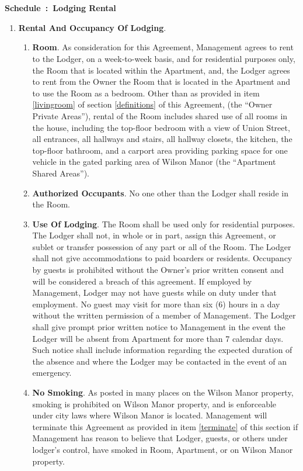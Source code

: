 \documentclass[]{article}
\newcounter{schedulecounter}
\renewcommand{\theschedulecounter}{\Alph{schedulecounter}}
\newenvironment{schedule}[1] {%
	\refstepcounter{schedulecounter}%
	\noindent \textbf{\Large Schedule~\theschedulecounter:~{#1}}
	\noindent
}{}
\newcommand{\therental}{Lodging Rental}
\newcommand{\management}{Management}
\newcommand{\condo}{Wilson Manor}
\newcommand{\apt}{Apartment}
\newcommand{\room}{Room}
\newcommand{\shared}{Apartment Shared Areas}
\newcommand{\livingroom}{Owner Private Areas}
\begin{document}
\section*{} %
\begin{schedule}{\therental{}} \label{therental}
\begin{enumerate}
	\item \textbf{Rental And Occupancy Of Lodging}. 
		\begin{enumerate}
			\item \textbf{Room}.
				As consideration for this Agreement, \management{} agrees to rent to the Lodger, on a week-to-week basis, and for residential purposes only, the \room{} that is located within the \apt{}, and, the Lodger agrees to rent from the Owner the \room{} that is located in the \apt{} and to use the \room{} as a bedroom.  Other than as provided in item \ref{livingroom} of section \ref{definitions} of this Agreement, (the ``\livingroom{}''), rental of the \room{} includes shared use of all rooms in the house, including the top-floor bedroom with a view of Union Street, all entrances, all hallways and stairs, all hallway closets, the kitchen, the top-floor bathroom, and a carport area providing parking space for one vehicle in the gated parking area of \condo{} (the ``\shared{}'').
			\item \textbf{Authorized Occupants}. No one other than the Lodger shall reside in the \room{}. 
			\item \textbf{Use Of Lodging}. The \room{} shall be used only for residential purposes. The Lodger shall not, in whole or in part, assign this Agreement, or sublet or transfer possession of any part or all of the \room{}. The Lodger shall not give accommodations to paid boarders or residents. Occupancy by guests is prohibited without the Owner's prior written consent and will be considered a breach of this agreement. If employed by \management{}, Lodger may not have guests while on duty under that employment. No guest may visit for more than six (6) hours in a day without the written permission of a member of \management{}. The Lodger shall give prompt prior written notice to \management{} in the event the Lodger will be absent from \apt{} for more than 7 calendar days. Such notice shall include information regarding the expected duration of the absence and where the Lodger may be contacted in the event of an emergency. 
			\item \textbf{No Smoking}. \label{smoking}
				As posted in many places on the \condo{} property, smoking is prohibited on \condo{} property, and is enforceable under city laws where \condo{} is located. \management{} will terminate this Agreement as provided in item \ref{terminate} of this section if \management{} has reason to believe that Lodger, guests, or others under lodger's control, have smoked in \room{}, \apt{}, or on \condo{} property.

\end{enumerate}
\end{enumerate}
\end{schedule}
\end{document}
